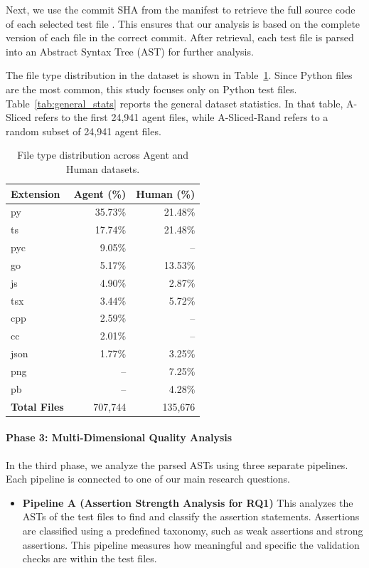 \documentclass[conference]{IEEEtran}
\begin{document}
Next, we use the commit SHA from the manifest to retrieve the full source code of each selected test file \cite{li2025riseaiteammatessoftware}. This ensures that our analysis is based on the complete version of each file in the correct commit. After retrieval, each test file is parsed into an Abstract Syntax Tree (AST) for further analysis.

The file type distribution in the dataset is shown in Table~\ref{tab:filetype_dist}. Since Python files are the most common, this study focuses only on Python test files. Table~\ref{tab:general_stats} reports the general dataset statistics. In that table, A-Sliced refers to the first 24,941 agent files, while A-Sliced-Rand refers to a random subset of 24,941 agent files.

\begin{table}[t]
\centering
\caption{File type distribution across Agent and Human datasets.}
\label{tab:filetype_dist}
\begin{tabular}{lrr}
\toprule
\textbf{Extension} & \textbf{Agent (\%)} & \textbf{Human (\%)} \\
\midrule
py   & 35.73\% & 21.48\% \\
ts   & 17.74\% & 21.48\% \\
pyc  & 9.05\%  & --      \\
go   & 5.17\%  & 13.53\% \\
js   & 4.90\%  & 2.87\%  \\
tsx  & 3.44\%  & 5.72\%  \\
cpp  & 2.59\%  & --      \\
cc   & 2.01\%  & --      \\
json & 1.77\%  & 3.25\%  \\
png  & --      & 7.25\%  \\
pb   & --      & 4.28\%  \\
\midrule
\textbf{Total Files} & 707{,}744 & 135{,}676 \\
\bottomrule
\end{tabular}
\end{table}


\paragraph{\textbf{Phase 3: Multi-Dimensional Quality Analysis}}
In the third phase, we analyze the parsed ASTs using three separate pipelines. Each pipeline is connected to one of our main research questions.

\begin{itemize}
    \item \textbf{Pipeline A (Assertion Strength Analysis for RQ1)} This analyzes the ASTs of the test files to find and classify the assertion statements. Assertions are classified using a predefined taxonomy, such as weak assertions and strong assertions. This pipeline measures how meaningful and specific the validation checks are within the test files.
\end{itemize}
\end{document}
